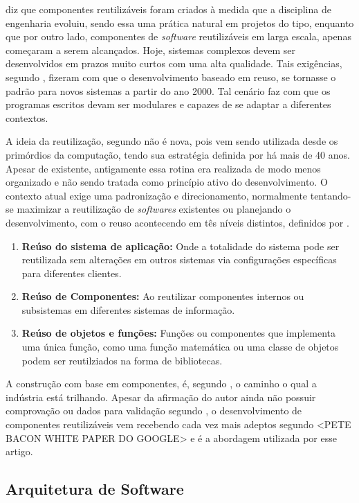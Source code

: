 \cite{pressman2011} diz que componentes reutilizáveis foram criados à medida que a disciplina de engenharia evoluiu, sendo essa uma prática natural em projetos do tipo, enquanto que por outro lado, componentes de \textit{software} reutilizáveis em larga escala, apenas começaram a serem alcançados. Hoje, sistemas complexos devem ser desenvolvidos em prazos muito curtos com uma alta qualidade. Tais exigências, segundo \cite{sommer07}, fizeram com que o desenvolvimento baseado em reuso, se tornasse o padrão para novos sistemas a partir do ano 2000. Tal cenário faz com que os programas escritos devam ser modulares e capazes de se adaptar a diferentes contextos.

A ideia da reutilização, segundo \cite{pressman2011} não é nova, pois vem sendo utilizada desde os primórdios da computação, tendo sua estratégia definida por \cite{unixPhilosophy} há mais de 40 anos. Apesar de existente, antigamente essa rotina era realizada de modo menos organizado e não sendo tratada como princípio ativo do desenvolvimento. O contexto atual exige uma padronização e direcionamento, normalmente tentando-se maximizar a reutilização de \textit{softwares} existentes ou planejando o desenvolvimento, com o reuso acontecendo em tês níveis distintos, definidos por \cite{sommer07}.

\begin{enumerate}
	\item \textbf{Reúso do sistema de aplicação:} Onde a totalidade do sistema pode ser reutilizada sem alterações em outros sistemas via configurações específicas para diferentes clientes.
	\item \textbf{Reúso de Componentes:} Ao reutilizar componentes internos ou subsistemas em diferentes sistemas de informação.
	\item \textbf{Reúso de objetos e funções:} Funções ou componentes que implementa uma única função, como uma função matemática ou uma classe de objetos  podem ser reutilziados na forma de bibliotecas. 
\end{enumerate}

A construção com base em componentes, é, segundo \cite{pressman2011}, o caminho o qual a indústria está trilhando. Apesar da afirmação do autor ainda não possuir comprovação ou dados para validação segundo \cite{28dbc}, o desenvolvimento de componentes reutilizáveis vem recebendo cada vez mais adeptos segundo <PETE BACON WHITE PAPER DO GOOGLE>  e é a abordagem utilizada por esse artigo.

\subsection{\esp Arquitetura de Software}

